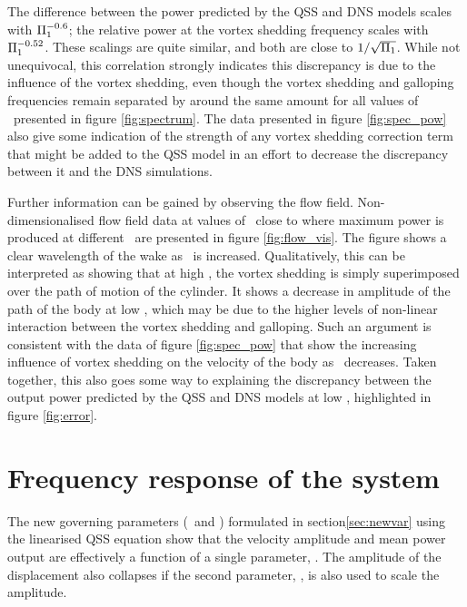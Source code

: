 The difference between the power predicted by the QSS and DNS models scales with $\Pi_1^{-0.6}$; the relative power at the vortex shedding frequency scales with $\Pi_1^{-0.52}$. These scalings are quite similar, and both are close to $1/\sqrt{\Pi_1}$. While not unequivocal, this correlation strongly indicates this discrepancy is due to the influence of the vortex shedding, even though the vortex shedding and galloping frequencies remain separated by around the same amount for all values of \massstiff\ presented in figure \ref{fig:spectrum}. The data presented in figure \ref{fig:spec_pow} also give some indication of the strength of any vortex shedding correction term that might be added to the QSS model in an effort to decrease the discrepancy between it and the DNS simulations.



Further information can be gained by observing the flow field. Non-dimensionalised flow field data at values of \massdamp\ close to where maximum power is produced at different \massstiff\ are presented in figure \ref{fig:flow_vis}. The figure shows a clear wavelength of the wake as \massstiff \ is increased. Qualitatively, this can be interpreted as showing that at high \massstiff, the vortex shedding is simply superimposed over the path of motion of the cylinder. It shows a decrease in amplitude of the path of the body at low \massstiff, which may be due to the higher levels of non-linear interaction between the vortex shedding and galloping. Such an argument is consistent with the data of figure \ref{fig:spec_pow} that show the increasing influence of vortex shedding on the velocity of the body as \massstiff\ decreases. Taken together, this also goes some way to explaining the discrepancy between the output power predicted by the QSS and DNS models at low \massstiff, highlighted in figure \ref{fig:error}.


\section{Frequency response of the system}

The new governing parameters (\massstiff\ and \massdamp) formulated in section\ref{sec:newvar}  using the linearised QSS equation show that the velocity amplitude and mean power output are effectively a function of a single parameter, \massdamp. The amplitude of the displacement also collapses if the second parameter, \massstiff, is also used to scale the amplitude.

